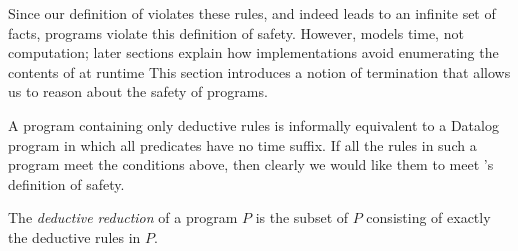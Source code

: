 Since our definition of  violates these rules, and indeed
leads to an infinite set of facts, \slang programs violate this
definition of safety.  However,  models time, not computation;
later sections explain how \lang implementations avoid enumerating the contents
of  at runtime 
This section
introduces a notion of termination that allows us to reason about the safety of
\slang programs.


  



A \slang program containing only deductive rules is informally equivalent to a
Datalog program in which all predicates have no time suffix.  If all the rules
in such a program meet the conditions above, then clearly we would like them to meet \slang's definition of safety. 

\begin{definition} 
%
The \emph{deductive reduction} of a \slang program $P$ is
the subset of $P$ consisting of exactly the deductive rules in $P$.
%
\end{definition}

